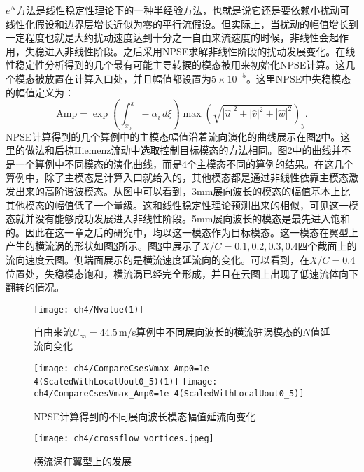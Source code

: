 $e^{N}$方法是线性稳定性理论下的一种半经验方法，也就是说它还是要依赖小扰动可线性化假设和边界层增长近似为零的平行流假设。但实际上，当扰动的幅值增长到一定程度也就是大约扰动速度达到十分之一自由来流速度的时候，非线性会起作用，失稳进入非线性阶段。之后采用NPSE求解非线性阶段的扰动发展变化。在线性稳定性分析得到的几个最有可能主导转捩的模态被用来初始化NPSE计算。这几个模态被放置在计算入口处，并且幅值都设置为$5\times10^{-5}$。这里NPSE中失稳模态的幅值定义为：
\begin{equation}
\mathrm{Amp}=\exp\!\left(\int_{x_0}^x -\alpha _i\,d\xi\right)\max\!\left(\sqrt{\left| \hat{u} \right|^2+\left| \hat{v} \right|^2+\left| \hat{w} \right|^2}\right)_y.
\end{equation}
NPSE计算得到的几个算例中的主模态幅值沿着流向演化的曲线展示在图\ref{f:NPSE}中。这里的做法和后掠Hiemenz流动中选取控制目标模态的方法相同。图\ref{f:NPSE}中的曲线并不是一个算例中不同模态的演化曲线，而是4个主模态不同的算例的结果。在这几个算例中，除了主模态是计算入口就给入的，其他模态都是通过非线性依靠主模态激发出来的高阶谐波模态。从图中可以看到，3mm展向波长的模态的幅值基本上比其他模态的幅值低了一个量级。这和线性稳定性理论预测出来的相似，可见这一模态就并没有能够成功发展进入非线性阶段。5mm展向波长的模态是最先进入饱和的。因此在这一章之后的研究中，均以这一模态作为目标模态。这一模态在翼型上产生的横流涡的形状如图\ref{f:crossflowonwing}所示。图\ref{f:crossflowonwing}中展示了$X/C=0.1,0.2,0.3,0.4$四个截面上的流向速度云图。侧端面展示的是横流速度延流向的变化。可以看到，在$X/C=0.4$位置处，失稳模态饱和，横流涡已经完全形成，并且在云图上出现了低速流体向下翻转的情况。
\begin{figure}[htb]
\centering
  \texttt{[image: ch4/Nvalue(1)]}
  \caption{自由来流$U_\infty= 44.5$\,m/s算例中不同展向波长的横流驻涡模态的$N$值延流向变化}%
  \label{fig:Nfactor445}
\end{figure}
\begin{figure}[htb]
\centering
  \texttt{[image: ch4/CompareCsesVmax\_Amp0=1e-4(ScaledWithLocalUout0\_5)(1)]} \texttt{[image: ch4/CompareCsesVmax\_Amp0=1e-4(ScaledWithLocalUout0\_5)]}
  \caption{NPSE计算得到的不同展向波长模态幅值延流向变化}\label{f:NPSE}%
\end{figure}
\begin{figure}[htb]
  \centering
  \texttt{[image: ch4/crossflow\_vortices.jpeg]}
  \caption{横流涡在翼型上的发展}\label{f:crossflowonwing}
\end{figure}


